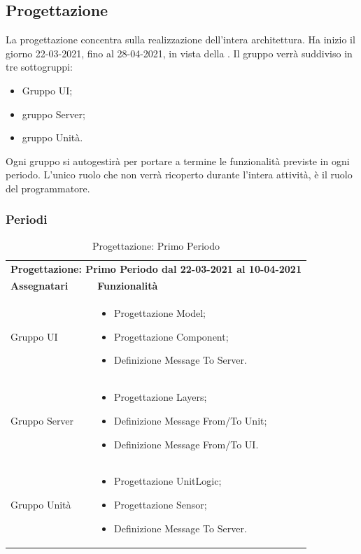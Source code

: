 \subsection{Progettazione}
La progettazione concentra sulla realizzazione dell'intera architettura. Ha inizio il giorno 22-03-2021, fino al 28-04-2021, in vista della .
Il gruppo verrà suddiviso in tre sottogruppi:
\begin{itemize}
	\item Gruppo UI;
	\item gruppo Server;
	\item gruppo Unità.
\end{itemize} 
Ogni gruppo si autogestirà per portare a termine le funzionalità previste in ogni periodo.
L'unico ruolo che non verrà ricoperto durante l'intera attività, è il ruolo del programmatore.

\subsubsection{Periodi}

\begin{table} [h!]
	\begin{center}
		\begin{tabular} { m{4cm}  m{11cm}  }	
			\multicolumn{2}{c}{	\textbf{Progettazione: Primo Periodo dal 22-03-2021 al 10-04-2021}} \\
			\rowcolor{lightgray}
			\textbf{Assegnatari} & \textbf{Funzionalità} \\
			Gruppo UI & \begin{itemize}
				\item Progettazione Model;
				\item Progettazione Component;
				\item Definizione Message To Server.
			\end{itemize}\\
			Gruppo Server & \begin{itemize}
				\item Progettazione Layers;
				\item Definizione Message From/To Unit;
				\item Definizione Message From/To UI.
			\end{itemize}\\
			Gruppo Unità & \begin{itemize}
				\item Progettazione UnitLogic;
				\item Progettazione Sensor;
				\item Definizione Message To Server.
			\end{itemize}\\
		\end{tabular}
		\caption{Progettazione: Primo Periodo}
	\end{center}
\end{table}


